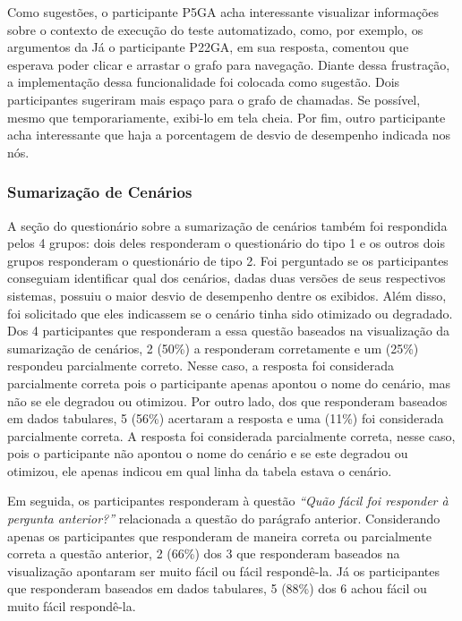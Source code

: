 Como sugestões, o participante P5GA acha interessante visualizar informações sobre o contexto de execução do teste automatizado, como, por exemplo, os argumentos da  Já o participante P22GA, em sua resposta, comentou que esperava poder clicar e arrastar o grafo para navegação. Diante dessa frustração, a implementação dessa funcionalidade foi colocada como sugestão. Dois participantes sugeriram mais espaço para o grafo de chamadas. Se possível, mesmo que temporariamente, exibi-lo em tela cheia. Por fim, outro participante acha interessante que haja a porcentagem de desvio de desempenho indicada nos nós.

\subsubsection{Sumarização de Cenários}

A seção do questionário sobre a sumarização de cenários também foi respondida pelos 4 grupos: dois deles responderam o questionário do tipo 1 e os outros dois grupos responderam o questionário de tipo 2. Foi perguntado se os participantes conseguiam identificar qual dos cenários, dadas duas versões de seus respectivos sistemas, possuiu o maior desvio de desempenho dentre os exibidos. Além disso, foi solicitado que eles indicassem se o cenário tinha sido otimizado ou degradado. Dos 4 participantes que responderam a essa questão baseados na visualização da sumarização de cenários, 2 (50\%) a responderam corretamente e um (25\%) respondeu parcialmente correto. Nesse caso, a resposta foi considerada parcialmente correta pois o participante apenas apontou o nome do cenário, mas não se ele degradou ou otimizou. Por outro lado, dos que responderam baseados em dados tabulares, 5 (56\%) acertaram a resposta e uma (11\%) foi considerada parcialmente correta. A resposta foi considerada parcialmente correta, nesse caso, pois o participante não apontou o nome do cenário e se este degradou ou otimizou, ele apenas indicou em qual linha da tabela estava o cenário.

Em seguida, os participantes responderam à questão \textit{``Quão fácil foi responder à pergunta anterior?''} relacionada a questão do parágrafo anterior. Considerando apenas os participantes que responderam de maneira correta ou parcialmente correta a questão anterior, 2 (66\%) dos 3 que responderam baseados na visualização apontaram ser muito fácil ou fácil respondê-la. Já os participantes que responderam baseados em dados tabulares, 5 (88\%) dos 6 achou fácil ou muito fácil respondê-la.


